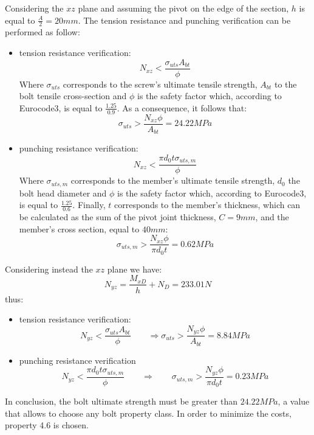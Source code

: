 Considering the $xz$ plane and assuming the pivot on the edge of the section, $h$ is equal to $\frac{A}{2} = 20 mm$. The tension resistance and punching verification can be performed as follow:
\begin{itemize}
    \item tension resistance verification:
    \begin{equation*}
        N_{xz} < \frac{\sigma_{uts}A_{bt}}{\phi}
    \end{equation*}
    Where $\sigma_{uts}$ corresponds to the screw's ultimate tensile strength, $A_{bt}$ to the bolt tensile cross-section and $\phi$ is the safety factor which, according to Eurocode3, is equal to $\frac{1.25}{0.9}$. As a consequence, it follows that:
    \begin{equation*}
       \sigma_{uts} > \frac{N_{xz}\phi}{A_{bt}} = 24.22 MPa
    \end{equation*}
    \item punching resistance verification:
    \begin{equation*}
        N_{xz} < \frac{\pi d_{0} t \sigma_{uts,m}}{\phi}
    \end{equation*}
    Where $\sigma_{uts,m}$ corresponds to the member's ultimate tensile strength, $d_{0}$ the bolt head diameter and $\phi$ is the safety factor which, according to Eurocode3, is equal to $\frac{1.25}{0.6}$. Finally, $t$ corresponds to the member's thickness, which can be calculated as the sum of the pivot joint thickness, $C = 9 mm$, and the member's cross section, equal to $40 mm$:
     \begin{equation*}
       \sigma_{uts,m} > \frac{N_{xz}\phi}{\pi d_{0}t} = 0.62 MPa
    \end{equation*}
\end{itemize}
Considering instead the $xz$ plane we have:\\
\begin{equation*}
    N_{yz} = \frac{M_{xD}}{h} + N_{D} = 233.01 N
\end{equation*}
thus:
\begin{itemize}
    \item tension resistance verification:
    \begin{equation*}
        N_{yz} < \frac{\sigma_{uts}A_{bt}}{\phi} \qquad \Rightarrow \sigma_{uts} > \frac{N_{yz}\phi}{A_{bt}} = 8.84 MPa
    \end{equation*}
    \item punching resistance verification\\
    \begin{equation*}
        N_{yz} < \frac{\pi d_{0} t \sigma_{uts,m}}{\phi} \qquad \Rightarrow \qquad   \sigma_{uts,m} > \frac{N_{yz}\phi}{\pi d_{0}t} = 0.23 MPa
    \end{equation*}
\end{itemize}
In conclusion, the bolt ultimate strength must be greater than $24.22 MPa$, a value that allows to choose any bolt property class. In order to minimize the costs, property 4.6 is chosen.

